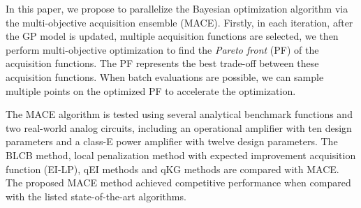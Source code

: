 In this paper, we propose to parallelize the Bayesian optimization algorithm
via the multi-objective acquisition ensemble (MACE). Firstly, in each
iteration, after the GP model is updated, multiple acquisition functions are
selected, we then perform multi-objective optimization to find the \emph{Pareto
front} (PF) of the acquisition functions. The PF represents the best trade-off
between these acquisition functions. When batch evaluations are possible, we
can sample multiple points on the optimized PF to accelerate the optimization.

The MACE algorithm is tested using several analytical benchmark functions and
two real-world analog circuits, including an operational amplifier with ten
design parameters and a class-E power amplifier with twelve design parameters.
The BLCB method, local penalization method with expected improvement
acquisition function (EI-LP), qEI methods and qKG methods are compared with
MACE. The proposed MACE method achieved competitive performance when compared
with the listed state-of-the-art algorithms.
